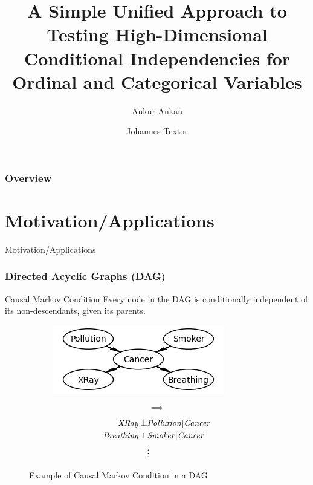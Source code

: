 \documentclass{beamer}
\def\ci{\perp\!\!\!\!\!\perp}
\begin{document}
\title[Unified CI test for Ordinal and Categorical Variables]{A Simple Unified Approach to Testing High-Dimensional Conditional Independencies for Ordinal and Categorical Variables}
\author {Ankur Ankan \and Johannes Textor}
\date{}
\maketitle

\begin{frame}
	\frametitle{Overview}
	\tableofcontents
\end{frame}

\section{Motivation/Applications}
\begin{frame}
	\begin{center} \Huge{Motivation/Applications} \end{center}
\end{frame}
\begin{frame}
	\frametitle{Directed Acyclic Graphs (DAG)}
	\begin{block}{Causal Markov Condition}
		Every node in the DAG is conditionally independent of its non-descendants, given its parents.
	\end{block}
	\vspace{1em}
	\begin{figure}
		\begin{subfigure}{0.46\textwidth}
			\centering
			\includegraphics[scale=0.7]{imgs/example_dag.png}
		\end{subfigure}%
		\begin{subfigure}{0.08\textwidth}
			$$ \bm{\implies} $$
		\end{subfigure}%
		\begin{subfigure}{0.46\textwidth}
			\begin{equation*}
				\begin{split}
					\text{\emph{XRay}} \ci & \text{\emph{Pollution}} | \text{\emph{Cancer}} \\
					\text{\emph{Breathing}} \ci & \text{\emph{Smoker}} | \text{\emph{Cancer}} \\
					& \vdots \\
				\end{split}
			\end{equation*}
		\end{subfigure}
		\caption*{Example of Causal Markov Condition in a DAG \footnotemark}
	\end{figure}
\end{frame}
\end{document}
